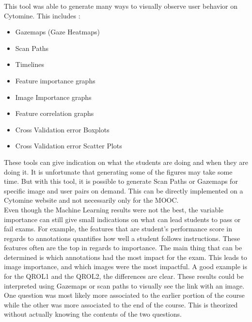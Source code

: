 \documentclass[a4paper,11pt]{report}
\numberwithin{figure}{chapter} %
\begin{document}
        This tool was able to generate many ways to visually observe user behavior on Cytomine. This includes :
        \begin{itemize}
            \item[\textbullet] Gazemaps (Gaze Heatmaps)
            \item[\textbullet] Scan Paths
            \item[\textbullet] Timelines
            \item[\textbullet] Feature importance graphs
            \item[\textbullet] Image Importance graphs
            \item[\textbullet] Feature correlation graphs
            \item[\textbullet] Cross Validation error Boxplots
            \item[\textbullet] Cross Validation error Scatter Plots
        \end{itemize}

        These tools can give indication on what the students are doing and when they are doing it.
        It is unfortunate that generating some of the figures may take some time.
        But with this tool, it is possible to generate Scan Paths or Gazemaps for specific image and user pairs on demand.
        This can be directly implemented on a Cytomine website and not necessarily only for the MOOC.\\


        Even though the Machine Learning results were not the best, the variable importance can still give small indications on what can lead students to pass or fail exams.
        For example, the features that are student's performance score in regards to annotations quantifies how well a student follows instructions.
        These features often are the top in regards to importance.
        The main thing that can be determined is which annotations had the most impact for the exam.
        This leads to image importance, and which images were the most impactful.
        A good example is for the QROL1 and the QROL2, the differences are clear.
        These results could be interpreted using Gazemaps or scan paths to visually see the link with an image.
        One question was most likely more associated to the earlier portion of the course while the other was more associated to the end of the course.
        This is theorized without actually knowing the contents of the two questions.
\end{document}
